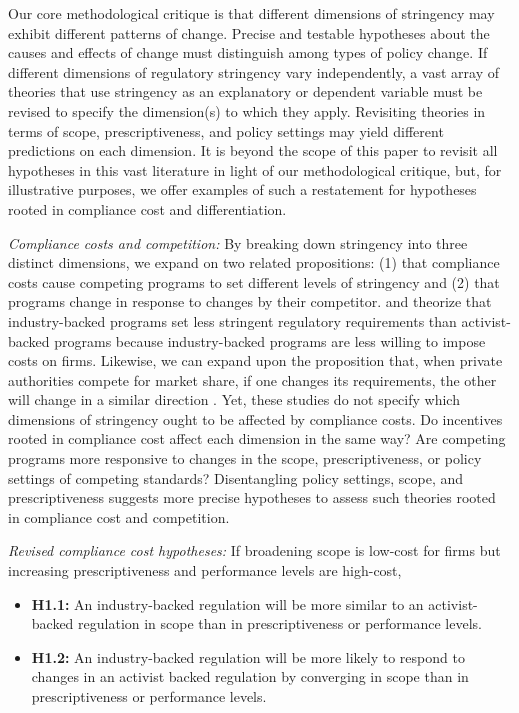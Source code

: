 \documentclass[
      12pt,
            Review ]{article}
\begin{document}
Our core methodological critique is that different dimensions of
stringency may exhibit different patterns of change. Precise and
testable hypotheses about the causes and effects of change must
distinguish among types of policy change. If different dimensions of
regulatory stringency vary independently, a vast array of theories that
use stringency as an explanatory or dependent variable must be revised
to specify the dimension(s) to which they apply. Revisiting theories in
terms of scope, prescriptiveness, and policy settings may yield
different predictions on each dimension. It is beyond the scope of this
paper to revisit all hypotheses in this vast literature in light of our
methodological critique, but, for illustrative purposes, we offer
examples of such a restatement for hypotheses rooted in compliance cost
and differentiation.

\emph{Compliance costs and competition:} By breaking down stringency
into three distinct dimensions, we expand on two related propositions:
(1) that compliance costs cause competing programs to set different
levels of stringency and (2) that programs change in response to changes
by their competitor. \citet{Cashore2004} and \citet{Fischer2014}
theorize that industry-backed programs set less stringent regulatory
requirements than activist-backed programs because industry-backed
programs are less willing to impose costs on firms. Likewise, we can
expand upon the proposition that, when private authorities compete for
market share, if one changes its requirements, the other will change in
a similar direction \citep{Fischer2014, Smith2010}. Yet, these studies
do not specify which dimensions of stringency ought to be affected by
compliance costs. Do incentives rooted in compliance cost affect each
dimension in the same way? Are competing programs more responsive to
changes in the scope, prescriptiveness, or policy settings of competing
standards? Disentangling policy settings, scope, and prescriptiveness
suggests more precise hypotheses to assess such theories rooted in
compliance cost and competition.

\emph{Revised compliance cost hypotheses:} If broadening scope is
low-cost for firms but increasing prescriptiveness and performance
levels are high-cost,

\begin{itemize}
\item
  \textbf{H1.1:} An industry-backed regulation will be more similar to
  an activist-backed regulation in scope than in prescriptiveness or
  performance levels.
\item
  \textbf{H1.2:} An industry-backed regulation will be more likely to
  respond to changes in an activist backed regulation by converging in
  scope than in prescriptiveness or performance levels.
\end{itemize}
\end{document}
